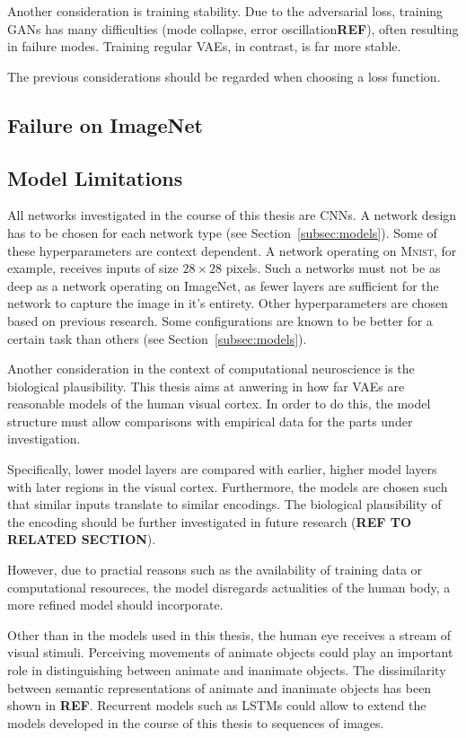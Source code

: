 \documentclass[11pt]{article}
\begin{document}
Another consideration is training stability.
Due to the adversarial loss, training \acp{GAN} has many difficulties (mode collapse, error oscillation\textbf{REF}), often resulting in failure modes.
Training regular \acp{VAE}, in contrast, is far more stable.

The previous considerations should be regarded when choosing a loss function.

\subsection{Failure on ImageNet}

\subsection{Model Limitations}
All networks investigated in the course of this thesis are \acp{CNN}.
A network design has to be chosen for each network type (see Section~\ref{subsec:models}).
Some of these hyperparameters are context dependent.
A network operating on \textsc{Mnist}, for example, receives inputs of size $28\times 28$ pixels.
Such a networks must not be as deep as a network operating on ImageNet, as fewer layers are sufficient for the network to capture the image in it's entirety.
Other hyperparameters are chosen based on previous research.
Some configurations are known to be better for a certain task than others (see Section~\ref{subsec:models}).

Another consideration in the context of computational neuroscience is the biological plausibility.
This thesis aims at anwering in how far \acp{VAE} are reasonable models of the human visual cortex.
In order to do this, the model structure must allow comparisons with empirical data for the parts under investigation.

Specifically, lower model layers are compared with earlier, higher model layers with later regions in the visual cortex.
Furthermore, the models are chosen such that similar inputs translate to similar encodings.
The biological plausibility of the encoding should be further investigated in future research (\textbf{REF TO RELATED SECTION}).

However, due to practial reasons such as the availability of training data or computational resoureces, the model disregards actualities of the human body, a more refined model should incorporate.

Other than in the models used in this thesis, the human eye receives a stream of visual stimuli.
Perceiving movements of animate objects could play an important role in distinguishing between animate and inanimate objects.
The dissimilarity between semantic representations of animate and inanimate objects has been shown in \textbf{REF}.
Recurrent models such as LSTMs could allow to extend the models developed in the course of this thesis to sequences of images.
\end{document}
